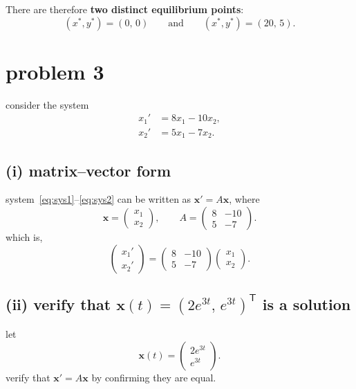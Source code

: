 \documentclass[12pt]{article}
\begin{document}
There are therefore \textbf{two distinct equilibrium points}:
\[
    (x^*, y^*) = (0,\, 0)
    \qquad \text{and} \qquad
    (x^*, y^*) = (20,\, 5).
\]

\section*{problem 3}
 
consider the system
\begin{align}
    x_1' &= 8x_1 - 10x_2, \label{eq:sys1}\\
    x_2' &= 5x_1 - 7x_2. \label{eq:sys2}
\end{align}
 
\subsection*{(i) matrix--vector form}
 
system~\eqref{eq:sys1}--\eqref{eq:sys2} can be written as
$\mathbf{x}' = A\mathbf{x}$, where
\[
    \mathbf{x} = \begin{pmatrix} x_1 \\ x_2 \end{pmatrix}, \qquad
    A = \begin{pmatrix} 8 & -10 \\ 5 & -7 \end{pmatrix}.
\]
which is,
\[
    \begin{pmatrix} x_1' \\ x_2' \end{pmatrix}
    =
    \begin{pmatrix} 8 & -10 \\ 5 & -7 \end{pmatrix}
    \begin{pmatrix} x_1 \\ x_2 \end{pmatrix}.
\]
 
\subsection*{(ii) verify that $\mathbf{x}(t) = (2e^{3t},\, e^{3t})^{\mathsf{T}}$ is a solution}
 
let
\[
    \mathbf{x}(t) = \begin{pmatrix} 2e^{3t} \\ e^{3t} \end{pmatrix}.
\]
verify that $\mathbf{x}' = A\mathbf{x}$ by confirming they are equal.
 
\end{document}
